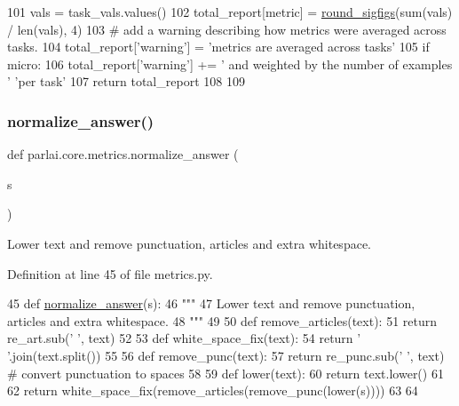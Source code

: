\begin{DoxyCode}
101                 vals = task\_vals.values()
102                 total\_report[metric] = \hyperlink{namespaceparlai_1_1agents_1_1legacy__agents_1_1seq2seq_1_1utils__v0_af377ec61bfc0423461e7b409ffc883b9}{round\_sigfigs}(sum(vals) / len(vals), 4)
103     \textcolor{comment}{# add a warning describing how metrics were averaged across tasks.}
104     total\_report[\textcolor{stringliteral}{'warning'}] = \textcolor{stringliteral}{'metrics are averaged across tasks'}
105     \textcolor{keywordflow}{if} micro:
106         total\_report[\textcolor{stringliteral}{'warning'}] += \textcolor{stringliteral}{' and weighted by the number of examples '} \textcolor{stringliteral}{'per task'}
107     \textcolor{keywordflow}{return} total\_report
108 
109 
\end{DoxyCode}
\mbox{\label{namespaceparlai_1_1core_1_1metrics_ae7769a6b628f41081e0f43043d52031a}} 
\subsubsection{\texorpdfstring{normalize\+\_\+answer()}{normalize\_answer()}}
{\footnotesize\ttfamily def parlai.\+core.\+metrics.\+normalize\+\_\+answer (\begin{DoxyParamCaption}\item[{}]{s }\end{DoxyParamCaption})}

\begin{DoxyVerb}Lower text and remove punctuation, articles and extra whitespace.
\end{DoxyVerb}
 

Definition at line 45 of file metrics.\+py.


\begin{DoxyCode}
45 \textcolor{keyword}{def }\hyperlink{namespaceparlai_1_1core_1_1metrics_ae7769a6b628f41081e0f43043d52031a}{normalize\_answer}(s):
46     \textcolor{stringliteral}{"""}
47 \textcolor{stringliteral}{    Lower text and remove punctuation, articles and extra whitespace.}
48 \textcolor{stringliteral}{    """}
49 
50     \textcolor{keyword}{def }remove\_articles(text):
51         \textcolor{keywordflow}{return} re\_art.sub(\textcolor{stringliteral}{' '}, text)
52 
53     \textcolor{keyword}{def }white\_space\_fix(text):
54         \textcolor{keywordflow}{return} \textcolor{stringliteral}{' '}.join(text.split())
55 
56     \textcolor{keyword}{def }remove\_punc(text):
57         \textcolor{keywordflow}{return} re\_punc.sub(\textcolor{stringliteral}{' '}, text)  \textcolor{comment}{# convert punctuation to spaces}
58 
59     \textcolor{keyword}{def }lower(text):
60         \textcolor{keywordflow}{return} text.lower()
61 
62     \textcolor{keywordflow}{return} white\_space\_fix(remove\_articles(remove\_punc(lower(s))))
63 
64 
\end{DoxyCode}


